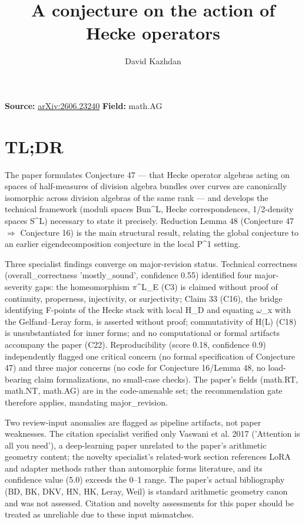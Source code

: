 \documentclass[11pt]{article}
\title{A conjecture on the action of Hecke operators}
\author{David Kazhdan}
\date{}
\begin{document}
\maketitle

\noindent\textbf{Source:} \href{https://arxiv.org/abs/2606.23240}{arXiv:2606.23240} \quad \textbf{Field:} math.AG\\

\section*{TL;DR}
The paper formulates Conjecture 47 --- that Hecke operator algebras acting on spaces of half-measures of division algebra bundles over curves are canonically isomorphic across division algebras of the same rank --- and develops the technical framework (moduli spaces Bun\^{}L, Hecke correspondences, 1/2-density spaces S\^{}L) necessary to state it precisely. Reduction Lemma 48 (Conjecture 47 \ensuremath{\Rightarrow} Conjecture 16) is the main structural result, relating the global conjecture to an earlier eigendecomposition conjecture in the local P\^{}1 setting.

Three specialist findings converge on major-revision status. Technical correctness (overall\_correctness 'mostly\_sound', confidence 0.55) identified four major-severity gaps: the homeomorphism \ensuremath{\pi}\^{}L\_E (C3) is claimed without proof of continuity, properness, injectivity, or surjectivity; Claim 33 (C16), the bridge identifying F-points of the Hecke stack with local H\_D and equating \ensuremath{\omega}\_x with the Gelfand--Leray form, is asserted without proof; commutativity of H(L) (C18) is unsubstantiated for inner forms; and no computational or formal artifacts accompany the paper (C22). Reproducibility (score 0.18, confidence 0.9) independently flagged one critical concern (no formal specification of Conjecture 47) and three major concerns (no code for Conjecture 16/Lemma 48, no load-bearing claim formalizations, no small-case checks). The paper's fields (math.RT, math.NT, math.AG) are in the code-amenable set; the recommendation gate therefore applies, mandating major\_revision.

Two review-input anomalies are flagged as pipeline artifacts, not paper weaknesses. The citation specialist verified only Vaswani et al. 2017 ('Attention is all you need'), a deep-learning paper unrelated to the paper's arithmetic geometry content; the novelty specialist's related-work section references LoRA and adapter methods rather than automorphic forms literature, and its confidence value (5.0) exceeds the 0--1 range. The paper's actual bibliography (BD, BK, DKV, HN, HK, Leray, Weil) is standard arithmetic geometry canon and was not assessed. Citation and novelty assessments for this paper should be treated as unreliable due to these input mismatches.
\end{document}
